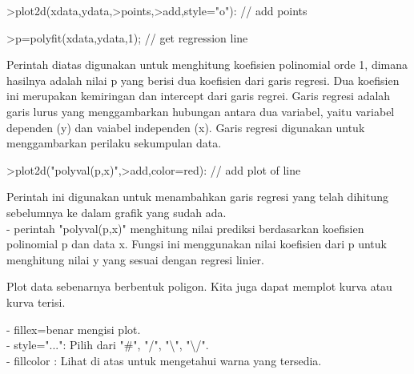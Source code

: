 \documentclass[a4paper,10pt]{article}
\begin{document}
\begin{eulernotebook}
\begin{eulercomment}
\begin{eulercomment}
\begin{eulercomment}
\begin{eulercomment}
\begin{eulercomment}
\begin{eulercomment}
\begin{eulercomment}
\end{eulercomment}
\begin{eulerprompt}
>plot2d(xdata,ydata,>points,>add,style="o"): // add points
\end{eulerprompt}
\begin{eulerprompt}
>p=polyfit(xdata,ydata,1); // get regression line
\end{eulerprompt}
\begin{eulercomment}
Perintah diatas digunakan untuk menghitung koefisien polinomial orde
1, dimana hasilnya adalah nilai p yang berisi dua koefisien dari garis
regresi. Dua koefisien ini merupakan kemiringan dan intercept dari
garis regrei. Garis regresi adalah garis lurus yang menggambarkan
hubungan antara dua variabel, yaitu variabel dependen (y) dan vaiabel
independen (x). Garis regresi digunakan untuk menggambarkan perilaku
sekumpulan data.
\end{eulercomment}
\begin{eulerprompt}
>plot2d("polyval(p,x)",>add,color=red): // add plot of line
\end{eulerprompt}
\begin{eulercomment}
Perintah ini digunakan untuk menambahkan garis regresi yang telah
dihitung sebelumnya ke dalam grafik yang sudah ada.\\
- perintah "polyval(p,x)" menghitung nilai prediksi berdasarkan
koefisien polinomial p dan data x. Fungsi ini menggunakan nilai
koefisien dari p untuk menghitung nilai y yang sesuai dengan regresi
linier.

\begin{eulercomment}
\begin{eulercomment}
Plot data sebenarnya berbentuk poligon. Kita juga dapat memplot kurva
atau kurva terisi.

- fillex=benar mengisi plot.\\
- style="...": Pilih dari "#", "/", "\textbackslash{}", "\textbackslash{}/".\\
- fillcolor : Lihat di atas untuk mengetahui warna yang tersedia.


\end{eulercomment}
\end{eulercomment}
\end{eulercomment}
\end{eulercomment}
\end{eulercomment}
\end{eulercomment}
\end{eulercomment}
\end{eulercomment}
\end{eulercomment}
\end{eulernotebook}
\end{document}
